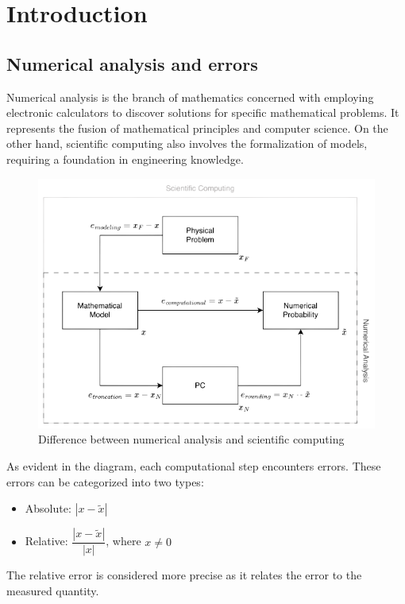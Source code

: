 \documentclass[12pt, a4paper]{report}
\begin{document}
\newpage

\tableofcontents

\newpage

\chapter{Introduction}
    \section{Numerical analysis and errors}
    Numerical analysis is the branch of mathematics concerned with employing electronic calculators to discover solutions for specific mathematical problems. 
    It represents the fusion of mathematical principles and computer science.
    On the other hand, scientific computing also involves the formalization of models, requiring a foundation in engineering knowledge.
    \begin{figure}[H]
        \centering
        \includegraphics[width=0.75\linewidth]{images/difference.png}
        \caption{Difference between numerical analysis and scientific computing}
    \end{figure}
    As evident in the diagram, each computational step encounters errors. These errors can be categorized into two types:
    \begin{itemize}
        \item Absolute: $\left\lvert x - \tilde{x} \right\rvert$
        \item Relative: $\dfrac{\left\lvert x - \tilde{x} \right\rvert}{\left\lvert x \right\rvert}$, where $x \neq 0$
    \end{itemize}
    The relative error is considered more precise as it relates the error to the measured quantity.
\end{document}
